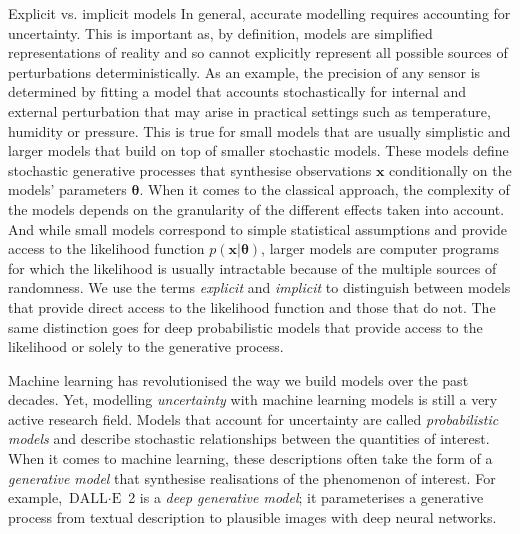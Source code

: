 \begin{side_note}{Explicit vs. implicit models}
  In general, accurate modelling requires accounting for uncertainty. This is important as, by definition, models are simplified representations of reality and so cannot explicitly represent all possible sources of perturbations deterministically. As an example, the precision of any sensor is determined by fitting a model that accounts stochastically for internal and external perturbation that may arise in practical settings such as temperature, humidity or pressure. This is true for small models that are usually simplistic and larger models that build on top of smaller stochastic models. These models define stochastic generative processes that synthesise observations $\mathbf{x}$ conditionally on the models' parameters $\mathbf{\theta}$. When it comes to the classical approach, the complexity of the models depends on the granularity of the different effects taken into account. And while small models correspond to simple statistical assumptions and provide access to the likelihood function $p(\mathbf{x}|\mathbf{\theta})$, larger models are computer programs for which the likelihood is usually intractable because of the multiple sources of randomness. We use the terms \textit{explicit} and \textit{implicit} to distinguish between models that provide direct access to the likelihood function and those that do not. The same distinction goes for deep probabilistic models that provide access to the likelihood or solely to the generative process.
\end{side_note}


Machine learning has revolutionised the way we build models over the past decades. Yet, modelling \textit{uncertainty} with machine learning models is still a very active research field. Models that account for uncertainty are called \textit{probabilistic models} and describe stochastic relationships between the quantities of interest. When it comes to machine learning, these descriptions often take the form of a \textit{generative model} that synthesise realisations of the phenomenon of interest. For example, $\text{DALL}\cdot\text{E}$ 2 is a \textit{deep generative model}; it parameterises a generative process from textual description to plausible images with deep neural networks.

